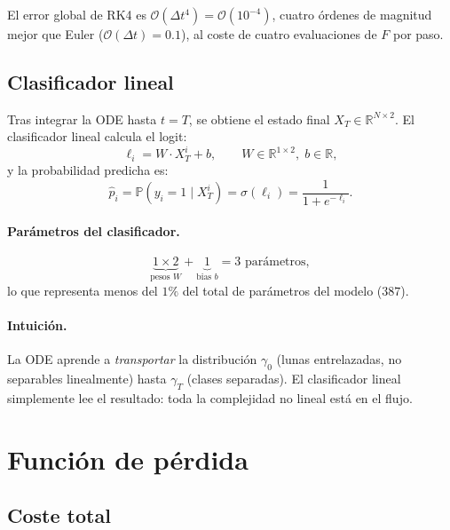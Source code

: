 \documentclass[11pt, a4paper]{article}
\theoremstyle{definition}
\newcommand{\R}{\mathbb{R}}
\newcommand{\Prob}{\mathbb{P}}
\begin{document}
El error global de RK4 es $\mathcal{O}(\Delta t^4) = \mathcal{O}(10^{-4})$,
cuatro órdenes de magnitud mejor que Euler ($\mathcal{O}(\Delta t) = 0.1$),
al coste de cuatro evaluaciones de $F$ por paso.

\subsection{Clasificador lineal}
\label{sec:clasificador}

Tras integrar la ODE hasta $t = T$, se obtiene el estado final
$X_T \in \R^{N \times 2}$. El clasificador lineal calcula el logit:
\begin{equation}
  \ell_i = W \cdot X_T^{i} + b,
  \qquad W \in \R^{1 \times 2},\; b \in \R,
\end{equation}
y la probabilidad predicha es:
\begin{equation}
  \hat{p}_i = \Prob(y_i = 1 \mid X_T^{i}) = \sigma(\ell_i)
  = \frac{1}{1 + e^{-\ell_i}}.
\end{equation}

\paragraph{Parámetros del clasificador.}
\begin{equation}
  \underbrace{1 \times 2}_{\text{pesos } W} + \underbrace{1}_{\text{bias } b}
  = 3 \text{ parámetros},
\end{equation}
lo que representa menos del $1\%$ del total de parámetros del modelo ($387$).

\paragraph{Intuición.}
La ODE aprende a \emph{transportar} la distribución $\gamma_0$ (lunas
entrelazadas, no separables linealmente) hasta $\gamma_T$ (clases separadas).
El clasificador lineal simplemente lee el resultado: toda la complejidad
no lineal está en el flujo.

\section{Función de pérdida}
\label{sec:perdida}

\subsection{Coste total}
\end{document}
